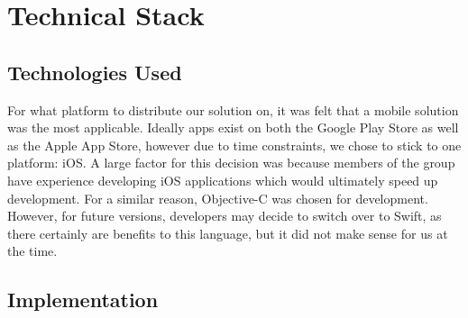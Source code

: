 \section{Technical Stack}
\subsection{Technologies Used}
For what platform to distribute our solution on, it was felt that a mobile solution was the most applicable. Ideally apps exist on both the Google Play Store as well as the Apple App Store, however due to time constraints, we chose to stick to one platform: iOS. A large factor for this decision was because members of the group have experience developing iOS applications which would ultimately speed up development. For a similar reason, Objective-C was chosen for development. However, for future versions, developers may decide to switch over to Swift, as there certainly are benefits to this language, but it did not make sense for us at the time.
\subsection{Implementation}
